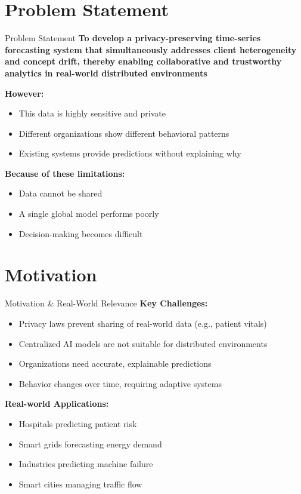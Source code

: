 \documentclass[aspectratio=169, 11pt]{beamer}
\begin{document}
\section{Problem Statement}
\begin{frame}{Problem Statement}
    \textbf{To develop a privacy-preserving time-series forecasting system that simultaneously addresses client heterogeneity and concept drift, thereby enabling collaborative and trustworthy analytics in real-world distributed environments} 

    \vspace{0.3cm}
    \textbf{However:}
    \begin{itemize}
        \item This data is highly sensitive and private
        \item Different organizations show different behavioral patterns
        \item Existing systems provide predictions without explaining why
    \end{itemize}

    \vspace{0.3cm}
    \textbf{Because of these limitations:}
    \begin{itemize}
        \item Data cannot be shared
        \item A single global model performs poorly
        \item Decision-making becomes difficult
    \end{itemize}
\end{frame}

\section{Motivation}
\begin{frame}{Motivation \& Real-World Relevance}
    \textbf{Key Challenges:}
    \begin{itemize}
        \item Privacy laws prevent sharing of real-world data (e.g., patient vitals)
        \item Centralized AI models are not suitable for distributed environments
        \item Organizations need accurate, explainable predictions
        \item Behavior changes over time, requiring adaptive systems
    \end{itemize}

    \vspace{0.3cm}
    \textbf{Real-world Applications:}
    \begin{itemize}
        \item Hospitals predicting patient risk
        \item Smart grids forecasting energy demand
        \item Industries predicting machine failure
        \item Smart cities managing traffic flow
    \end{itemize}
\end{frame}
\end{document}
